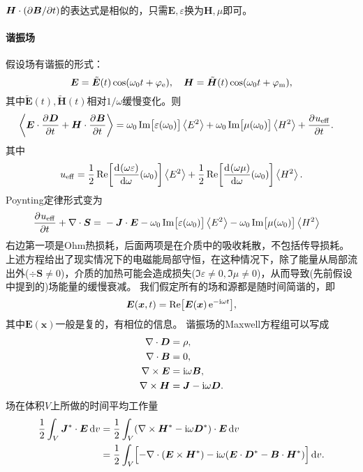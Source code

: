 $\bm H\cdot(\partial\bm B/\partial t)$的表达式是相似的，只需$\bm E,\varepsilon$换为$\bm H,\mu$即可。
\paragraph{谐振场}
假设场有谐振的形式： 
\[
    \bm E=\tilde{\bm E}(t)\cos(\omega_0t+\varphi_\mathrm e),\quad\bm H=\tilde{\bm H}(t)\cos(\omega_0t+\varphi_\text m),
\]
其中$\tilde{\bm E}(t),\tilde{\bm H}(t)$相对$1/\omega$缓慢变化。则
\begin{align*}
    \left\langle \bm E\cdot\frac{\partial^{{}}\bm D}{\partial{t}^{{}}}+\bm H\cdot\frac{\partial^{{}}\bm B}{\partial{t}^{{}}}\right\rangle={}&\omega_0\operatorname{Im}\bigl[\varepsilon(\omega_0)\bigr]\left\langle E^2\right\rangle+
    \omega_0\operatorname{Im}\bigl[\mu(\omega_0)\bigr]\left\langle H^2\right\rangle+\frac{\partial^{{}}u_\mathrm{eff}}{\partial{t}^{{}}}.
\end{align*}
其中 
\[
    u_\mathrm{eff}=\frac12\operatorname{Re}\biggl[\frac{\mathrm{d}^{{}}(\omega\varepsilon)}{\mathrm{d}{\omega}^{{}}}(\omega_0)\biggr]\left\langle E^2\right\rangle+\frac12\operatorname{Re}\biggl[\frac{\mathrm{d}^{{}}(\omega\mu)}{\mathrm{d}{\omega}^{{}}}(\omega_0)\biggr]\left\langle H^2\right\rangle.
\]
Poynting定律形式变为
\begin{align}
    \label{eqn:Poynting with loss}
    \frac{\partial^{{}}u_\mathrm{eff}}{\partial{t}^{{}}}+\nabla\cdot\bm S={}&-\bm J\cdot\bm E-\omega_0\operatorname{Im}\bigl[\varepsilon(\omega_0)\bigr]\left\langle E^2\right\rangle-\omega_0\operatorname{Im}\bigl[\mu(\omega_0)\bigr]\left\langle H^2\right\rangle
\end{align}
右边第一项是Ohm热损耗，后面两项是在介质中的吸收耗散，不包括传导损耗。
上述方程给出了现实情况下的电磁能局部守恒，在这种情况下，除了能量从局部流出外($\div\bm S\neq 0$)，介质的加热可能会造成损失($\Im\varepsilon\neq 0,\Im\mu\neq 0$)，从而导致(先前假设中提到的)场能量的缓慢衰减。
我们假定所有的场和源都是随时间简谐的，即 
\[
    \bm E(\bm x,t)=\operatorname{Re}\bigl[\bm E(\bm x)\mathop{}\!\mathrm{e}^{-\mathrm{i}\omega t}\bigr],
\]
其中$\bm E(\bm x)$一般是复的，有相位的信息。
谐振场的Maxwell方程组可以写成
\begin{subequations}
    \begin{align}
        \nabla\cdot\bm D&=\rho,\\
        \nabla\cdot\bm B&=0,\\
        \label{eqn:Maxwell curlE freq}
        \nabla\times\bm E&=\mathrm{i}\omega\bm B,\\
        \label{eqn:Maxwell curlH freq}
        \nabla\times\bm H&=\bm J-\mathrm{i}\omega\bm D.
    \end{align}
\end{subequations}
场在体积$V$上所做的时间平均工作量
\begin{align*}
    \frac12\int_V\bm J^\ast\cdot\bm E\mathop{}\!\mathrm{d} v&=\frac12\int_V(\nabla\times\bm H^\ast-\mathrm{i}\omega\bm D^\ast)\cdot\bm E\mathop{}\!\mathrm{d} v\\
    &=\frac12\int_V\Bigl[-\nabla\cdot(\bm E\times\bm H^\ast)-\mathrm{i}\omega(\bm E\cdot\bm D^\ast-\bm B\cdot\bm H^\ast)\Bigr]\mathop{}\!\mathrm{d} v.
\end{align*}
